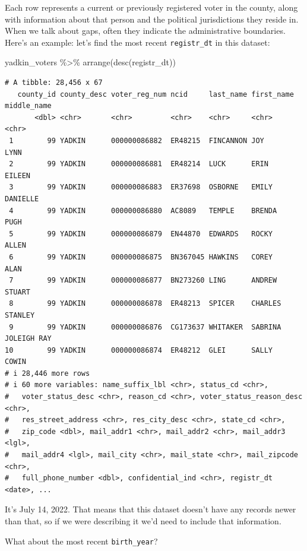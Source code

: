 \documentclass[
  letterpaper,
  DIV=11,
  numbers=noendperiod]{scrreprt}
\newenvironment{Shaded}{\begin{snugshade}}{\end{snugshade}}
\newcommand{\FunctionTok}[1]{\textcolor[rgb]{0.28,0.35,0.67}{#1}}
\newcommand{\NormalTok}[1]{\textcolor[rgb]{0.00,0.23,0.31}{#1}}
\newcommand{\SpecialCharTok}[1]{\textcolor[rgb]{0.37,0.37,0.37}{#1}}
\begin{document}
Each row represents a current or previously registered voter in the
county, along with information about that person and the political
jurisdictions they reside in. When we talk about gaps, often they
indicate the administrative boundaries. Here's an example: let's find
the most recent \texttt{registr\_dt} in this dataset:

\begin{Shaded}
\begin{Highlighting}[]
\NormalTok{yadkin\_voters }\SpecialCharTok{\%\textgreater{}\%} \FunctionTok{arrange}\NormalTok{(}\FunctionTok{desc}\NormalTok{(registr\_dt))}
\end{Highlighting}
\end{Shaded}

\begin{verbatim}
# A tibble: 28,456 x 67
   county_id county_desc voter_reg_num ncid     last_name first_name middle_name
       <dbl> <chr>       <chr>         <chr>    <chr>     <chr>      <chr>      
 1        99 YADKIN      000000086882  ER48215  FINCANNON JOY        LYNN       
 2        99 YADKIN      000000086881  ER48214  LUCK      ERIN       EILEEN     
 3        99 YADKIN      000000086883  ER37698  OSBORNE   EMILY      DANIELLE   
 4        99 YADKIN      000000086880  AC8089   TEMPLE    BRENDA     PUGH       
 5        99 YADKIN      000000086879  EN44870  EDWARDS   ROCKY      ALLEN      
 6        99 YADKIN      000000086875  BN367045 HAWKINS   COREY      ALAN       
 7        99 YADKIN      000000086877  BN273260 LING      ANDREW     STUART     
 8        99 YADKIN      000000086878  ER48213  SPICER    CHARLES    STANLEY    
 9        99 YADKIN      000000086876  CG173637 WHITAKER  SABRINA    JOLEIGH RAY
10        99 YADKIN      000000086874  ER48212  GLEI      SALLY      COWIN      
# i 28,446 more rows
# i 60 more variables: name_suffix_lbl <chr>, status_cd <chr>,
#   voter_status_desc <chr>, reason_cd <chr>, voter_status_reason_desc <chr>,
#   res_street_address <chr>, res_city_desc <chr>, state_cd <chr>,
#   zip_code <dbl>, mail_addr1 <chr>, mail_addr2 <chr>, mail_addr3 <lgl>,
#   mail_addr4 <lgl>, mail_city <chr>, mail_state <chr>, mail_zipcode <chr>,
#   full_phone_number <dbl>, confidential_ind <chr>, registr_dt <date>, ...
\end{verbatim}

It's July 14, 2022. That means that this dataset doesn't have any
records newer than that, so if we were describing it we'd need to
include that information.

What about the most recent \texttt{birth\_year}?
\end{document}
